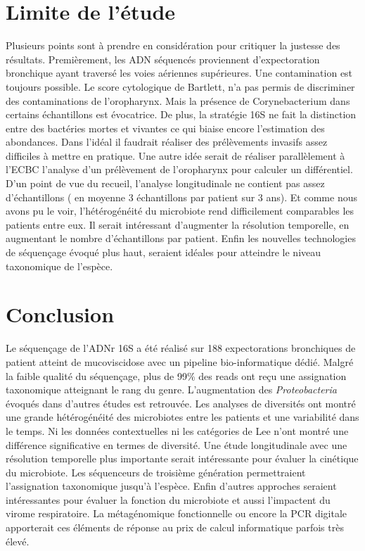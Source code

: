 \documentclass[12pt,a4paper]{article}
\begin{document}
{\section{Limite de l'étude}
Plusieurs points sont à prendre en considération pour critiquer la justesse des résultats. Premièrement, les ADN séquencés proviennent d'expectoration bronchique ayant traversé les voies aériennes supérieures. Une contamination est toujours possible. Le score cytologique de Bartlett, n'a pas permis de discriminer des contaminations de l'oropharynx. Mais la présence de Corynebacterium dans certains échantillons est évocatrice. 
De plus, la stratégie 16S ne fait la distinction entre des bactéries mortes et vivantes ce qui biaise encore l'estimation des abondances. 
Dans l'idéal il faudrait réaliser des prélèvements invasifs assez difficiles à mettre en pratique. Une autre idée serait de réaliser parallèlement à l'ECBC l'analyse d'un prélèvement de l'oropharynx pour calculer un différentiel. \\
D'un point de vue du recueil, l'analyse longitudinale ne contient pas assez d'échantillons ( en moyenne 3 échantillons par patient sur 3 ans). Et comme nous avons pu le voir, l'hétérogénéité du microbiote rend difficilement comparables les patients entre eux. Il serait intéressant d'augmenter la résolution temporelle, en augmentant le nombre d'échantillons par patient. 
Enfin les nouvelles technologies de séquençage évoqué plus haut, seraient idéales pour atteindre le niveau taxonomique de l'espèce. 


\section{Conclusion}
Le séquençage de l'ADNr 16S a été réalisé sur 188 expectorations bronchiques de patient atteint de mucoviscidose avec un pipeline bio-informatique dédié. Malgré la faible qualité du séquençage, plus de 99\% des reads ont reçu une assignation taxonomique atteignant le rang du genre. L'augmentation des \textit{Proteobacteria} évoqués dans d'autres études est retrouvée. 
Les analyses de diversités ont montré une grande hétérogénéité des microbiotes entre les patients et une variabilité dans le temps. 
Ni les données contextuelles ni les catégories de Lee n'ont montré une différence significative en termes de diversité. 
Une étude longitudinale avec une résolution temporelle plus importante serait intéressante pour évaluer la cinétique du microbiote. Les séquenceurs de troisième génération permettraient l'assignation taxonomique jusqu'à l'espèce.
Enfin d'autres approches seraient intéressantes pour évaluer la fonction du microbiote et aussi l'impactent du virome respiratoire. La métagénomique fonctionnelle ou encore la PCR digitale apporterait ces éléments de réponse au prix de calcul informatique parfois très élevé.


}
\end{document}
